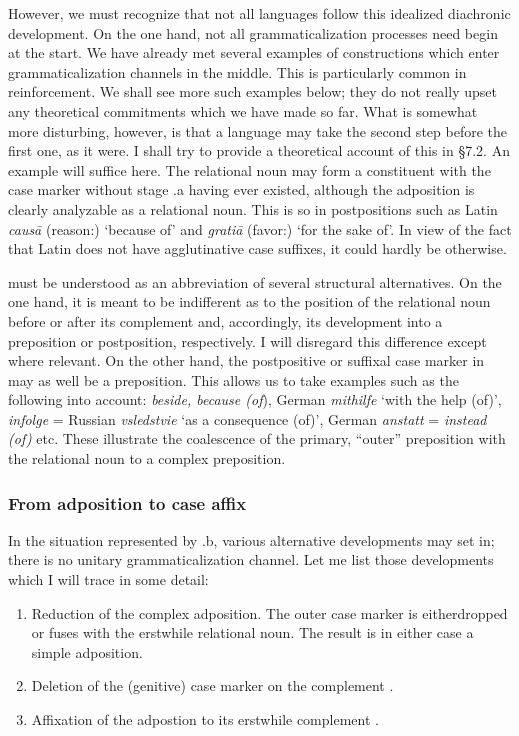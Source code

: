 However, we must recognize that not all languages follow this idealized diachronic development. On the one hand, not all grammaticalization processes need begin at the start. We have already met several examples of constructions which enter grammaticalization channels in the middle. This is particularly common in reinforcement. We shall see more such examples below; they do not really upset any theoretical commitments which we have made so far. What is somewhat more disturbing, however, is that a language may take the second step before the first one, as it were. I shall try to provide a theoretical account of this in §7.2. An example will suffice here. The relational noun may form a constituent with the case marker without stage .a having ever existed, although the adposition is clearly analyzable as a relational noun. This is so in postpositions such as Latin \textit{caus\=a} (reason:\glabl) ‘because of’ and \textit{grati\=a} (favor:\glabl) ‘for the sake of’. In view of the fact that Latin does not have agglutinative case suffixes, it could hardly be otherwise.

 must be understood as an abbreviation of several structural alternatives. On the one hand, it is meant to be indifferent as to the position of the relational noun before or after its complement and, accordingly, its development into a preposition or postposition, respectively. I will disregard this difference except where relevant. On the other hand, the postpositive or suffixal case marker in  may as well be a preposition. This allows us to take examples such as the following into account: \textit{beside, because (of}), German \textit{mithilfe} ‘with the help (of)’, \textit{infolge} = Russian \textit{vsledstvie} ‘as a consequence (of)’, German \textit{anstatt} = \textit{instead (of)} etc. These illustrate the coalescence of the primary, “outer” preposition with the relational noun to a complex preposition.

\subsubsection{From adposition to case affix} \label{sec:3.4.1.3}
In the situation represented by .b, various alternative developments may set in; there is no unitary grammaticalization channel. Let me list those developments which I will trace in some detail:

\begin{enumerate}\enlargethispage{1\baselineskip}
\item Reduction of the complex adposition. The outer case marker is either\linebreak dropped or fuses with the erstwhile relational noun. The result is in either case a simple adposition.

\item Deletion of the (genitive) case marker on the complement \np.

\item Affixation of the adpostion to its erstwhile complement \np.
\end{enumerate}

